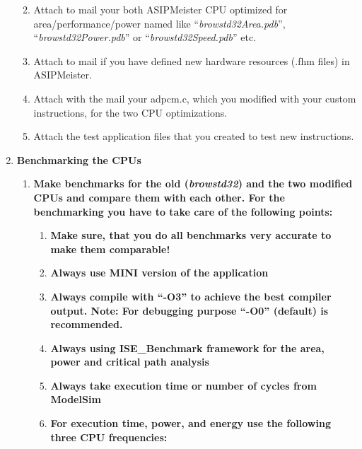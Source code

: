 \documentclass[
]{article}
\begin{document}
\begin{enumerate}
  \begin{enumerate}
  \def\labelenumii{\alph{enumii}.}
  \item
    Attach to mail your both ASIPMeister CPU optimized for
    area/performance/power named like ``\emph{browstd32Area.pdb}'',
    ``\emph{browstd32Power.pdb}'' or ``\emph{browstd32Speed.pdb}'' etc.
  \item
    Attach to mail if you have defined new hardware resources (.fhm
    files) in ASIPMeister.
  \item
    Attach with the mail your adpcm.c, which you modified with your
    custom instructions, for the two CPU optimizations.
  \item
    Attach the test application files that you created to test new
    instructions.
  \end{enumerate}
\item
  \textbf{Benchmarking the CPUs}

  \begin{enumerate}
  \def\labelenumii{\arabic{enumii}.}
  \item
    \textbf{Make benchmarks for the old (\emph{browstd32}) and the two
    modified CPUs and compare them with each other. For the benchmarking
    you have to take care of the following points:}

    \begin{enumerate}
    \def\labelenumiii{\arabic{enumiii}.}
    \item
      \textbf{Make sure, that you do all benchmarks very accurate to
      make them comparable!}
    \item
      \textbf{Always use MINI version of the application}
    \item
      \textbf{Always compile with ``-O3'' to achieve the best compiler
      output. Note: For debugging purpose ``-O0'' (default) is
      recommended.}
    \item
      \textbf{Always using ISE\_Benchmark framework for the area, power
      and critical path analysis}
    \item
      \textbf{Always take execution time or number of cycles from
      ModelSim}
    \item
      \textbf{For execution time, power, and energy use the following
      three CPU frequencies:}


\end{enumerate}
\end{enumerate}
\end{enumerate}
\end{document}
